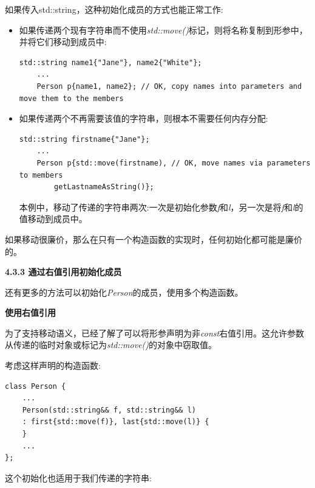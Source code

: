 如果传入std::string，这种初始化成员的方式也能正常工作:\par

\begin{itemize}
	\item 如果传递两个现有字符串而不使用\textit{std::move()}标记，则将名称复制到形参中，并将它们移动到成员中:\par
	\begin{lstlisting}[caption={}]
	std::string name1{"Jane"}, name2{"White"};
	...
	Person p{name1, name2}; // OK, copy names into parameters and move them to the members
	\end{lstlisting}
	\item 如果传递两个不再需要该值的字符串，则根本不需要任何内存分配:
	\begin{lstlisting}[caption={}]
	std::string firstname{"Jane"};
	...
	Person p{std::move(firstname), // OK, move names via parameters to members
		getLastnameAsString()};
	\end{lstlisting}
	本例中，移动了传递的字符串两次:一次是初始化参数\textit{f}和\textit{l}，另一次是将\textit{f}和\textit{l}的值移动到成员中。
\end{itemize}

如果移动很廉价，那么在只有一个构造函数的实现时，任何初始化都可能是廉价的。\par

\hspace*{\fill} \par %
\textbf{4.3.3 通过右值引用初始化成员}

还有更多的方法可以初始化\textit{Person}的成员，使用多个构造函数。\par

\hspace*{\fill} \par %
\textbf{使用右值引用}

为了支持移动语义，已经了解了可以将形参声明为非\textit{const}右值引用。这允许参数从传递的临时对象或标记为\textit{std::move()}的对象中窃取值。\par

考虑这样声明的构造函数:\par

\begin{lstlisting}[caption={}]
class Person {
	...
	Person(std::string&& f, std::string&& l)
	: first{std::move(f)}, last{std::move(l)} {
	}
	...
};
\end{lstlisting}

这个初始化也适用于我们传递的字符串:\par


